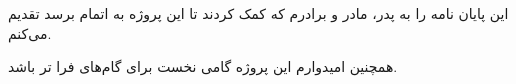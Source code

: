\begin{acknowledgementpage}

\vspace{1.5cm}

{\nastaliq
{
این پایان نامه را به پدر، مادر و برادرم که کمک کردند تا این پروژه به اتمام برسد تقدیم می‌کنم. 

همچنین امیدوارم این پروژه گامی نخست برای گام‌های فرا تر باشد.



}}\end{acknowledgementpage}
\newpage
